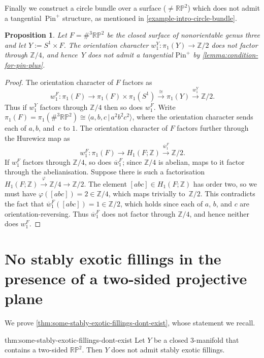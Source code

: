 \documentclass[a4paper, reqno]{amsart}
\newtheorem{proposition}{Proposition}[section]
\theoremstyle{definition}
\theoremstyle{remark}
\newcommand{\Z}{\mathbb{Z}}
\newcommand{\pinplus}{{\mathrm{Pin}^+}\!}
\newcommand{\RP}{\mathbb{RP}}
\begin{document}
Finally we construct a circle bundle over a surface ($\neq \RP^2$) which does not admit a tangential~$\pinplus$ structure, as mentioned in \cref{example-intro-circle-bundle}. 

\begin{proposition}\label{prop:circle-bundle}
    Let $F= \#^3 \RP^2$ be the closed surface of nonorientable genus three and let $Y := S^1 \times F$. The orientation character $w_1^Y\colon \pi_1(Y)\to\Z/2$ does not factor through $\Z/4$, and hence~$Y$ does not admit a tangential $\pinplus$ by \cref{lemma:condition-for-pin-plus}.
\end{proposition}

\begin{proof}
    The orientation character of $F$ factors as 
    \[w_1^{F} \colon \pi_1(F) \to \pi_1(F) \times \pi_1(S^1) \xrightarrow{\cong} \pi_1(Y) \xrightarrow{w^Y_1} \Z/2.\] 
    Thus if $w_1^Y$ factors through $\Z/4$ then so does $w_1^{F}$.  
    Write $\pi_1(F) = \pi_1(\#^3 \RP^2) \cong \langle a,b,c \,|\, a^2b^2c^2 \rangle$, where the orientation character sends each of $a,b$, and~$c$ to $1$. The orientation character of $F$ factors further through the Hurewicz map as
    \[
    w_1^{F} \colon \pi_1(F) \to H_1(F;\Z) \xrightarrow{\overline{w}_1^{F}} \Z/2.
    \]
    If $w_1^{F}$ factors through $\Z/4$, so does $\overline{w}_1^{F}$; since $\Z/4$ is abelian, maps to it factor through the abelianisation.  Suppose there is such a factorisation $H_1(F;\Z)\xrightarrow{\varphi} \Z/4\to \Z/2$. The element $[abc] \in H_1(F;\Z)$ has order two, so we must have $\varphi([abc])=2\in \Z/4$, which maps trivially to~$\Z/2$. This contradicts the fact that $\overline{w}_1^{F}([abc])=1\in \Z/2$, which holds since each of $a$, $b$, and $c$ are orientation-reversing. 
    Thus $\overline{w}_1^{F}$ does not factor through $\Z/4$, and hence neither does $w_1^{F}$.  
\end{proof}



\section{No stably exotic fillings in the presence of a two-sided projective plane}\label{section:non-existence}

We prove \cref{thm:some-stably-exotic-fillings-dont-exist}, whose statement we recall. 

\begin{reptheorem}{thm:some-stably-exotic-fillings-dont-exist}
   Let $Y$ be a closed 3-manifold that contains a two-sided $\RP^2$.  Then $Y$ does not admit stably exotic fillings. 
\end{reptheorem}
\end{document}
